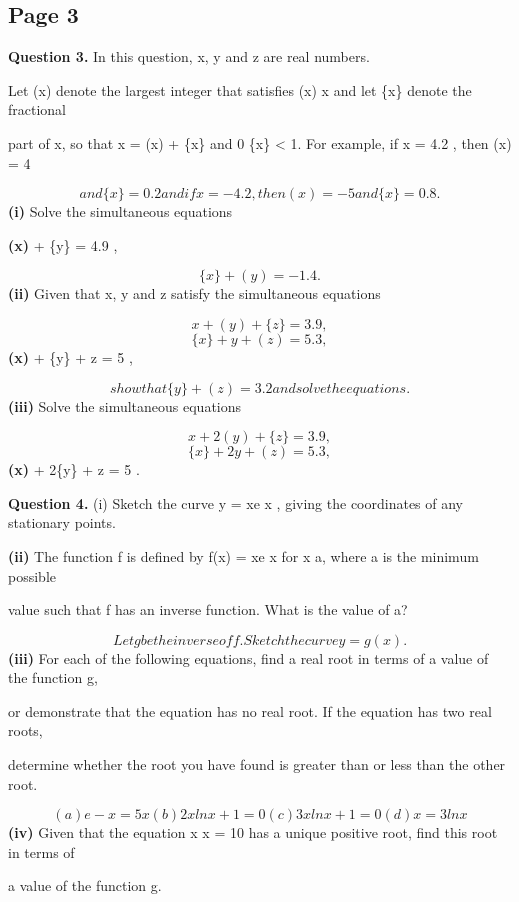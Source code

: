 \documentclass[12pt]{article}
\begin{document}
\subsection*{Page 3}
\begin{flushleft}
\bigskip\textbf{Question 3.} In this question, x, y and z are real numbers.\par
Let (x) denote the largest integer that satisfies (x) \leq x and let \{x\} denote the fractional\par
part of x, so that x = (x) + \{x\} and 0 \leq \{x\} < 1. For example, if x = 4.2 , then (x) = 4\par
\[and \{x\} = 0.2 and if x = -4.2 , then (x) = -5 and \{x\} = 0.8 .\]
\textbf{(i)} Solve the simultaneous equations\par
\textbf{(x)} + \{y\} = 4.9 ,\par
\[\{x\} + (y) = -1.4 .\]
\textbf{(ii)} Given that x, y and z satisfy the simultaneous equations\par
\[x + (y) + \{z\} = 3.9 ,\]
\[\{x\} + y + (z) = 5.3 ,\]
\textbf{(x)} + \{y\} + z = 5 ,\par
\[show that \{y\} + (z) = 3.2 and solve the equations.\]
\textbf{(iii)} Solve the simultaneous equations\par
\[x + 2(y) + \{z\} = 3.9 ,\]
\[\{x\} + 2y + (z) = 5.3 ,\]
\textbf{(x)} + 2\{y\} + z = 5 .\par
\bigskip\textbf{Question 4.} (i) Sketch the curve y = xe x , giving the coordinates of any stationary points.\par
\textbf{(ii)} The function f is defined by f(x) = xe x for x \geq a, where a is the minimum possible\par
value such that f has an inverse function. What is the value of a?\par
\[Let g be the inverse of f. Sketch the curve y = g(x).\]
\textbf{(iii)} For each of the following equations, find a real root in terms of a value of the function g,\par
or demonstrate that the equation has no real root. If the equation has two real roots,\par
determine whether the root you have found is greater than or less than the other root.\par
\[(a) e -x = 5x (b) 2x ln x + 1 = 0 (c) 3x ln x + 1 = 0 (d) x = 3 ln x\]
\textbf{(iv)} Given that the equation x x = 10 has a unique positive root, find this root in terms of\par
a value of the function g.\par
\end{flushleft}
\end{document}
